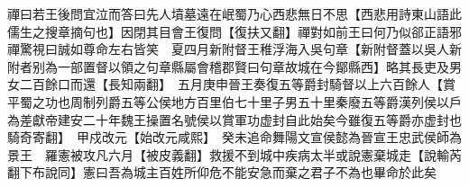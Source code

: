 禪曰若王後問宜泣而答曰先人墳墓遠在岷蜀乃心西悲無日不思【西悲用詩東山語此儒生之搜章摘句也】因閉其目會王復問【復扶又翻】禪對如前王曰何乃似郤正語邪禪驚視曰誠如尊命左右皆笑　夏四月新附督王稚浮海入吳句章【新附督蓋以吳人新附者别為一部置督以領之句章縣屬會稽郡賢曰句章故城在今鄮縣西】略其長吏及男女二百餘口而還【長知兩翻】　五月庚申晉王奏復五等爵封騎督以上六百餘人【賞平蜀之功也周制列爵五等公侯地方百里伯七十里子男五十里秦廢五等爵漢列侯以戶為差獻帝建安二十年魏王操置名號侯以賞軍功虚封自此始矣今雖復五等爵亦虚封也騎奇寄翻】　甲戍改元【始改元咸熙】　癸未追命舞陽文宣侯懿為晉宣王忠武侯師為景王　羅憲被攻凡六月【被皮義翻】救援不到城中疾病太半或說憲棄城走【說輸芮翻下布說同】憲曰吾為城主百姓所仰危不能安急而棄之君子不為也畢命於此矣